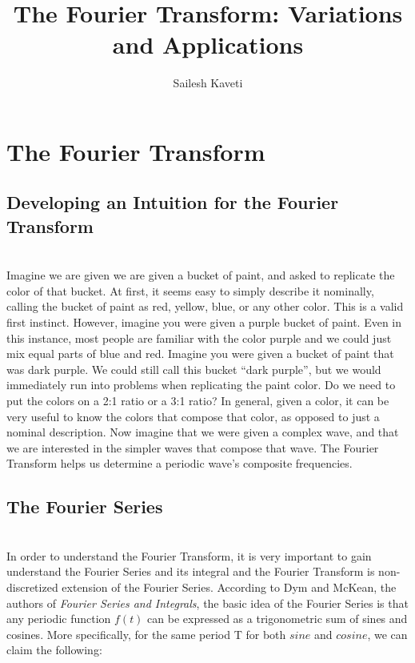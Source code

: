 \documentclass{amsproc}
\title{The Fourier Transform: Variations and Applications}
\author{Sailesh Kaveti}
\begin{document}
\maketitle


\tableofcontents
\newpage

\section{The Fourier Transform}

\subsection{Developing an Intuition for the Fourier Transform}

\mbox{}	\\
\indent Imagine we are given we are given a bucket of paint, and asked to replicate the color of that bucket. At first, it seems easy to simply describe it nominally, calling the bucket of paint as red, yellow, blue, or any other color.  This is a valid first instinct. However, imagine you were given a purple bucket of paint. Even in this instance, most people are familiar with the color purple and we could just mix equal parts of blue and red. Imagine you were given a bucket of paint that was dark purple. We could still call this bucket “dark purple”, but we would immediately run into problems when replicating the paint color. Do we need to put the colors on a 2:1 ratio or a 3:1 ratio? In general, given a color, it can be very useful to know the colors that compose that color, as opposed to just a nominal description. Now imagine that we were given a complex wave, and that we are interested in the simpler waves that compose that wave. The Fourier Transform helps us determine a periodic wave's composite frequencies.

\subsection{The Fourier Series}

\mbox{}	\\
\indent In order to understand the Fourier Transform, it is very important to gain understand the Fourier Series and its integral and the Fourier Transform is non-discretized extension of the Fourier Series. According to Dym and McKean, the authors of \textit{Fourier Series and Integrals}, the basic idea of the Fourier Series is that any periodic function $f(t)$ can be expressed as a trigonometric sum of sines and cosines. More specifically, for the same period T for both $sine$ and $cosine$, we can claim the following:
\end{document}
